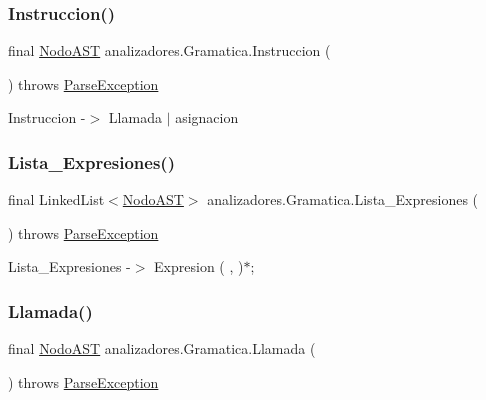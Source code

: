 \subsubsection{\texorpdfstring{Instruccion()}{Instruccion()}}
{\footnotesize\ttfamily final \mbox{\hyperlink{interfaceast_1_1_nodo_a_s_t}{Nodo\+A\+ST}} analizadores.\+Gramatica.\+Instruccion (\begin{DoxyParamCaption}{ }\end{DoxyParamCaption}) throws \mbox{\hyperlink{classanalizadores_1_1_parse_exception}{Parse\+Exception}}}

Instruccion -\/$>$ Llamada $\vert$ asignacion \mbox{\label{classanalizadores_1_1_gramatica_a85cf71aa91bab6d5875a0333d6c8eaa3}} 
\subsubsection{\texorpdfstring{Lista\+\_\+\+Expresiones()}{Lista\_Expresiones()}}
{\footnotesize\ttfamily final Linked\+List$<$\mbox{\hyperlink{interfaceast_1_1_nodo_a_s_t}{Nodo\+A\+ST}}$>$ analizadores.\+Gramatica.\+Lista\+\_\+\+Expresiones (\begin{DoxyParamCaption}{ }\end{DoxyParamCaption}) throws \mbox{\hyperlink{classanalizadores_1_1_parse_exception}{Parse\+Exception}}}

Lista\+\_\+\+Expresiones -\/$>$ Expresion ( , )$\ast$; \mbox{\label{classanalizadores_1_1_gramatica_adaa40a87451a4f0a9817d6aa699a29cc}} 
\subsubsection{\texorpdfstring{Llamada()}{Llamada()}}
{\footnotesize\ttfamily final \mbox{\hyperlink{interfaceast_1_1_nodo_a_s_t}{Nodo\+A\+ST}} analizadores.\+Gramatica.\+Llamada (\begin{DoxyParamCaption}{ }\end{DoxyParamCaption}) throws \mbox{\hyperlink{classanalizadores_1_1_parse_exception}{Parse\+Exception}}}

